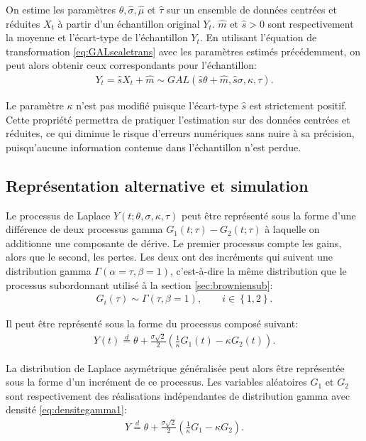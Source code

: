 On estime les paramètres $\hat\theta, \hat\sigma, \hat\mu$ et
$\hat\tau$ sur un ensemble de données centrées et réduites $X_t$ à
partir d'un échantillon original $Y_t$. $\hat{m} \text{ et }
\hat{s}>0$ sont respectivement la moyenne et l'écart-type de
l'échantillon $Y_t$. En utilisant l'équation de transformation
\eqref{eq:GALscaletrans} avec les paramètres estimés précédemment, on
peut alors obtenir ceux correspondants pour l'échantillon:
\begin{align}
  \label{eq:transparamGALNS}
  Y_t = \hat{s} X_t + \hat{m} \sim GAL(\hat{s} \theta +
  \hat{m},\hat{s}\sigma,\kappa,\tau) .
\end{align}

Le paramètre $\kappa$ n'est pas modifié puisque l'écart-type $\hat{s}$
est strictement positif. Cette propriété permettra de pratiquer
l'estimation sur des données centrées et réduites, ce qui diminue le
risque d'erreurs numériques sans nuire à sa précision, puisqu'aucune
information contenue dans l'échantillon n'est perdue.

\subsection{Représentation alternative et simulation}
\label{sec:simulationGAL}

Le processus de Laplace $Y(t;\theta,\sigma,\kappa,\tau)$ peut être
représenté sous la forme d'une différence de deux processus gamma
$G_1(t;\tau) - G_2(t;\tau)$ à laquelle on additionne une composante de
dérive. Le premier processus compte les gains, alors que le second,
les pertes. Les deux ont des incréments qui suivent une distribution
gamma $\Gamma(\alpha=\tau, \beta=1)$, c'est-à-dire la même
distribution que le processus
subordonnant utilisé à la section \ref{sec:browniensub}:
\begin{align}
  \label{eq:distributiongammaformealt}
  G_i(\tau) \sim \Gamma\left(\tau,\beta=1 \right), \qquad i\in\left\{
    1,2 \right\}.
\end{align}

Il peut être représenté sous la forme du processus composé suivant:
\begin{align}
  \label{eq:processuslaplace2gamma}
  Y(t) \stackrel{d}{=} \theta +
  \frac{\sigma\sqrt{2}}{2}\left(\frac{1}{\kappa} G_1(t) - \kappa
    G_2(t)\right).
\end{align}

La distribution de Laplace asymétrique généralisée peut alors être
représentée sous la forme d'un incrément de ce processus. Les
variables aléatoires $G_1$ et $G_2$ sont respectivement des
réalisations indépendantes de distribution gamma avec densité
\eqref{eq:densitegamma1}:
\begin{align}
  \label{eq:differencegamma}
  Y \stackrel{d}{=} \theta + \frac{\sigma\sqrt{2}}{2} \left(
    \frac{1}{\kappa} G_1 - \kappa G_2 \right).
\end{align}

